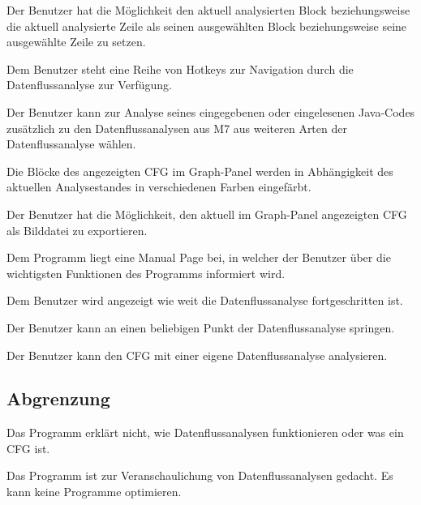 Der Benutzer hat die Möglichkeit den aktuell analysierten Block beziehungsweise die aktuell analysierte Zeile als seinen ausgewählten Block beziehungsweise seine ausgewählte Zeile zu setzen.

Dem Benutzer steht eine Reihe von Hotkeys zur Navigation durch die
Datenflussanalyse zur Verfügung.

Der Benutzer kann zur Analyse seines eingegebenen oder eingelesenen Java-Codes
zusätzlich zu den Datenflussanalysen aus M7 aus weiteren Arten der Datenflussanalyse
wählen.

Die Blöcke des angezeigten CFG im Graph-Panel werden in
Abhängigkeit des aktuellen Analysestandes in verschiedenen Farben eingefärbt.

Der Benutzer hat die Möglichkeit, den aktuell im Graph-Panel angezeigten CFG als Bilddatei zu exportieren. 

Dem Programm liegt eine Manual Page bei, in welcher der Benutzer über die wichtigsten Funktionen des Programms informiert wird.

Dem Benutzer wird angezeigt wie weit die Datenflussanalyse fortgeschritten ist.

Der Benutzer kann an einen beliebigen Punkt der Datenflussanalyse springen.

Der Benutzer kann den CFG mit einer eigene Datenflussanalyse analysieren.

\subsection{Abgrenzung}

Das Programm erklärt nicht, wie Datenflussanalysen funktionieren oder was ein CFG ist.

Das Programm ist zur Veranschaulichung von Datenflussanalysen gedacht. Es kann keine Programme optimieren.

